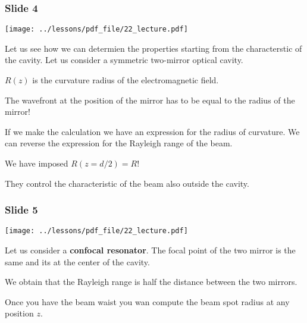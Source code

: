 \documentclass[../main/main.tex]{subfiles}
\begin{document}
\newpage

\subsubsection*{Slide 4}

\begin{minipage}[]{0.5\linewidth}
\centering
\texttt{[image: ../lessons/pdf\_file/22\_lecture.pdf]}
\end{minipage}
\hspace{0.3cm}\vspace{0.3cm}
\begin{minipage}[c]{0.47\linewidth}

Let us see how we can determien the properties starting from the characterstic of the cavity. Let us consider a symmetric two-mirror optical cavity.

\( R(z) \) is the curvature radius of the electromagnetic field.

The wavefront at the position of the mirror has to be equal to the radius of the mirror!

If we make the calculation we have an expression for the radius of curvature. We can reverse the expression for the Rayleigh range of the beam.

We have imposed \( R(z = d/2)  = R\)!

They control the characteristic of the beam also outside the cavity.

\end{minipage}

\subsubsection*{Slide 5}

\begin{minipage}[]{0.5\linewidth}
\centering
\texttt{[image: ../lessons/pdf\_file/22\_lecture.pdf]}
\end{minipage}
\hspace{0.3cm}\vspace{0.3cm}
\begin{minipage}[c]{0.47\linewidth}

Let us consider a \textbf{confocal resonator}. The focal point of the two mirror is the same and its at the center of the cavity.

We obtain that the Rayleigh range is half the distance between the two mirrors.

Once you have the beam waist you wan compute the beam spot radius at any position \( z \).

\end{minipage}
\end{document}
